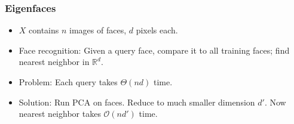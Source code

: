 \documentclass[10pt]{article}
\newcommand{\bigo}{\mathcal{O}}
\newcommand{\R}{\mathbb{R}}
\begin{document}
\subsubsection*{Eigenfaces}
\begin{itemize}
	\item $X$ contains $n$ images of faces, $d$ pixels each.
	\item Face recognition: Given a query face, compare it to all training faces; find nearest neighbor in $\R^{d}$.
	\item Problem: Each query takes $\Theta(nd)$ time.
	\item Solution: Run PCA on faces. Reduce to much smaller dimension $d'$. Now nearest neighbor takes $\bigo(nd')$ time.
\end{itemize}
\end{document}
